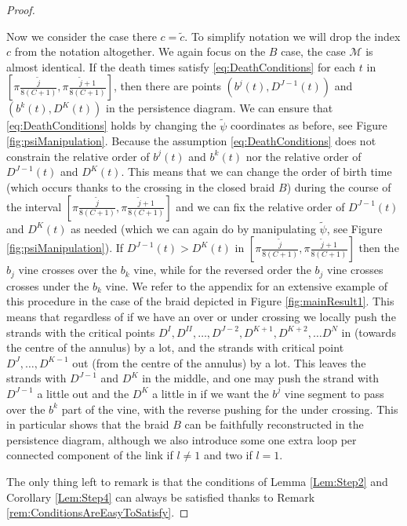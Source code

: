 \documentclass[twoside,leqno]{article}
\newcommand{\M}{\mathcal{M}}
\begin{document}
\begin{proof}
\begin{itemize}
Now we consider the case there $c=\tilde{c}$. To simplify notation we will drop the index $c$ from the notation altogether. We again focus on the $B$ case, the case $\M$ is almost identical. 
If the death times satisfy \eqref{eq:DeathConditions} for each $t$ in  $[ \pi \frac{\tilde{j}}{8 (C+1)} , \pi \frac{\tilde{j}+1}{8 (C+1)}  ]$, then there are points $(b^j (t),D^{J-1}(t))$ and $(b^k(t) , D^K(t) )$ in the persistence diagram. We can ensure that \eqref{eq:DeathConditions} holds by changing the $\tilde{\psi}$ coordinates as before, see Figure \ref{fig:psiManipulation}.
Because the assumption \eqref{eq:DeathConditions} does not constrain the relative order of $b^j (t)$ and $b^k (t)$ nor the relative order of $D^{J-1}(t)$ and $D^{K}(t)$. This means that we can change the order of birth time (which occurs thanks to the crossing in the closed braid $B$) during the course of the interval $[ \pi \frac{\tilde{j}}{8 (C+1)} , \pi \frac{\tilde{j}+1}{8 (C+1)} ]$ and we can fix the relative order of $D^{J-1}(t)$ and $D^{K}(t)$ as needed (which we can again do by manipulating $\tilde{\psi}$, see Figure \ref{fig:psiManipulation}). If $D^{J-1}(t)>D^{K}(t)$ in  $[ \pi \frac{\tilde{j}}{8 (C+1)} , \pi \frac{\tilde{j}+1}{8 (C+1)}  ]$ then the $b_j$ vine crosses over the $b_k$ vine, while for the reversed order the $b_j$ vine crosses crosses under the $b_k$ vine. We refer to the appendix for an extensive example of this procedure in the case of the braid depicted in Figure \ref{fig:mainResult1}. 
This means that regardless of if we have an over or under crossing we locally push the strands with the critical points $D^{I}, D^{II}, \dots, D^{J-2}, D^{K+1}, D^{K+2} , \dots D^N$ in (towards the centre of the annulus) by a lot, and the strands with critical point $D^{J}, \dots  , D^{K-1}$ out (from the centre of the annulus) by a lot. This leaves the strands with $D^{J-1}$ and $D^{K}$ in the middle, and one may push the strand with $D^{J-1}$ a little out and the $D^{K}$ a little in if we want the $b^j$ vine segment to pass over the $b^k$ part of the vine, with the reverse pushing for the under crossing.    
This in particular shows that the braid $B$ can be faithfully reconstructed in the persistence diagram, although we also introduce some one extra loop per connected component of the link if $l\neq 1$ and two if $l=1$. 

 
%
%
%
%
%
%
%
%
%
%
%
%
%
\end{itemize} 
The only thing left to remark is that the conditions of Lemma \ref{Lem:Step2} and Corollary \ref{Lem:Step4} can always be satisfied thanks to Remark \ref{rem:ConditionsAreEasyToSatisfy}. %
\end{proof}
\end{document}
